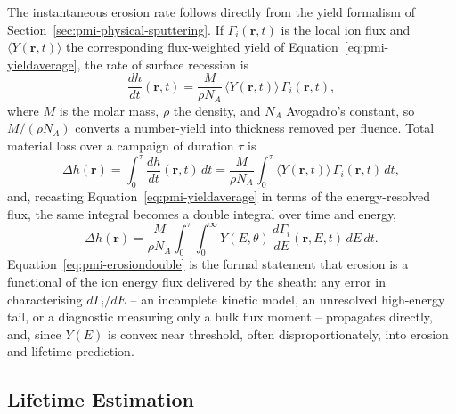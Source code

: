 The instantaneous erosion rate follows directly from the yield formalism of Section~\ref{sec:pmi-physical-sputtering}. If $\Gamma_i(\mathbf{r},t)$ is the local ion flux and $\langle Y(\mathbf{r},t)\rangle$ the corresponding flux-weighted yield of Equation~\eqref{eq:pmi-yieldaverage}, the rate of surface recession is
\begin{equation}
\frac{dh}{dt}(\mathbf{r},t) = \frac{M}{\rho N_A}\, \langle Y(\mathbf{r},t)\rangle\, \Gamma_i(\mathbf{r},t),
\label{eq:pmi-erosionrate}
\end{equation}
where $M$ is the molar mass, $\rho$ the density, and $N_A$ Avogadro's constant, so $M/(\rho N_A)$ converts a number-yield into thickness removed per fluence. Total material loss over a campaign of duration $\tau$ is
\begin{equation}
\Delta h(\mathbf{r}) = \int_0^\tau \frac{dh}{dt}(\mathbf{r},t)\, dt
= \frac{M}{\rho N_A} \int_0^\tau \langle Y(\mathbf{r},t)\rangle\, \Gamma_i(\mathbf{r},t)\, dt,
\label{eq:pmi-erosionintegral}
\end{equation}
and, recasting Equation~\eqref{eq:pmi-yieldaverage} in terms of the energy-resolved flux, the same integral becomes a double integral over time and energy,
\begin{equation}
\Delta h(\mathbf{r}) = \frac{M}{\rho N_A}\int_0^\tau\!\!\int_0^\infty Y(E,\theta)\, \frac{d\Gamma_i}{dE}(\mathbf{r},E,t)\, dE\, dt.
\label{eq:pmi-erosiondouble}
\end{equation}
Equation~\eqref{eq:pmi-erosiondouble} is the formal statement that erosion is a functional of the ion energy flux delivered by the sheath: any error in characterising $d\Gamma_i/dE$ -- an incomplete kinetic model, an unresolved high-energy tail, or a diagnostic measuring only a bulk flux moment -- propagates directly, and, since $Y(E)$ is convex near threshold, often disproportionately, into erosion and lifetime prediction.

\subsection{Lifetime Estimation}

